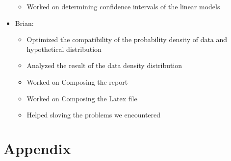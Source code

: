 \documentclass[11pt]{article}
\begin{document}
\begin{itemize}
\begin{itemize}
		\item Worked on determining confidence intervals of the linear models
	\end{itemize}
	\item Brian:\begin{itemize}
		\item Optimized the compatibility of the probability density of data and hypothetical distribution
		\item Analyzed the result of the data density distribution
		\item Worked on Composing the report
		\item Worked on Composing the Latex file
		\item Helped sloving the problems we encountered
		
	\end{itemize}
\end{itemize}
\newpage

\appendix
\section*{Appendix}

\end{document}
